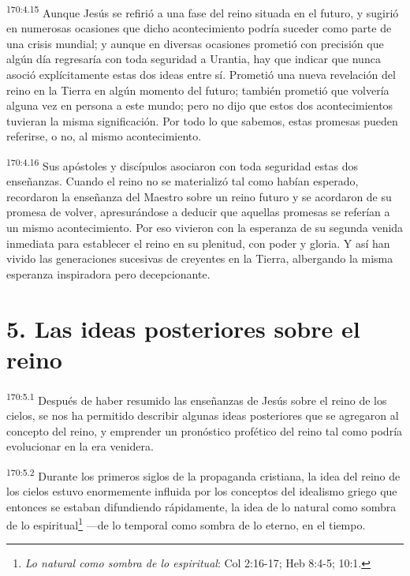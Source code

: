 \par 
\textsuperscript{170:4.15} Aunque Jesús se refirió a una fase del reino situada en el futuro, y sugirió en numerosas ocasiones que dicho acontecimiento podría suceder como parte de una crisis mundial; y aunque en diversas ocasiones prometió con precisión que algún día regresaría con toda seguridad a Urantia, hay que indicar que nunca asoció explícitamente estas dos ideas entre sí. Prometió una nueva revelación del reino en la Tierra en algún momento del futuro; también prometió que volvería alguna vez en persona a este mundo; pero no dijo que estos dos acontecimientos tuvieran la misma significación. Por todo lo que sabemos, estas promesas pueden referirse, o no, al mismo acontecimiento.

\par 
\textsuperscript{170:4.16} Sus apóstoles y discípulos asociaron con toda seguridad estas dos enseñanzas. Cuando el reino no se materializó tal como habían esperado, recordaron la enseñanza del Maestro sobre un reino futuro y se acordaron de su promesa de volver, apresurándose a deducir que aquellas promesas se referían a un mismo acontecimiento. Por eso vivieron con la esperanza de su segunda venida inmediata para establecer el reino en su plenitud, con poder y gloria. Y así han vivido las generaciones sucesivas de creyentes en la Tierra, albergando la misma esperanza inspiradora pero decepcionante.

\section*{5. Las ideas posteriores sobre el reino}
\par 
\textsuperscript{170:5.1} Después de haber resumido las enseñanzas de Jesús sobre el reino de los cielos, se nos ha permitido describir algunas ideas posteriores que se agregaron al concepto del reino, y emprender un pronóstico profético del reino tal como podría evolucionar en la era venidera.

\par 
\textsuperscript{170:5.2} Durante los primeros siglos de la propaganda cristiana, la idea del reino de los cielos estuvo enormemente influida por los conceptos del idealismo griego que entonces se estaban difundiendo rápidamente, la idea de lo natural como sombra de lo espiritual\footnote{\textit{Lo natural como sombra de lo espiritual}: Col 2:16-17; Heb 8:4-5; 10:1.} ---de lo temporal como sombra de lo eterno, en el tiempo.

